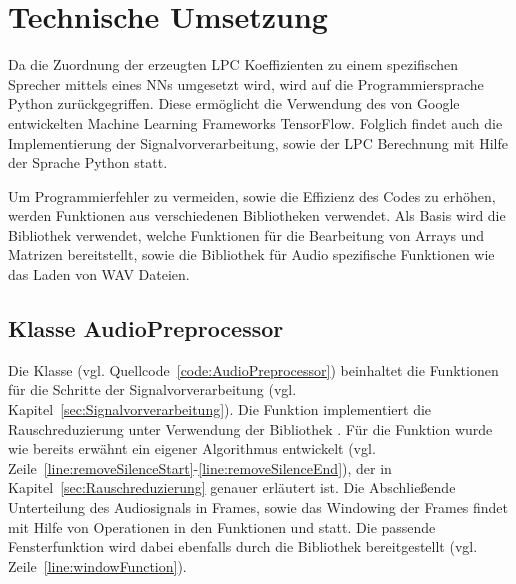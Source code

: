 \section{Technische Umsetzung}\label{sec:TechnischeUmsetzung}
Da die Zuordnung der erzeugten \ac{LPC} Koeffizienten zu einem spezifischen Sprecher mittels eines \acp{NN} umgesetzt wird, wird auf die Programmiersprache Python zurückgegriffen.
Diese ermöglicht die Verwendung des von Google entwickelten Machine Learning Frameworks TensorFlow.
Folglich findet auch die Implementierung der Signalvorverarbeitung, sowie der \ac{LPC} Berechnung mit Hilfe der Sprache Python statt.

Um Programmierfehler zu vermeiden, sowie die Effizienz des Codes zu erhöhen, werden Funktionen aus verschiedenen Bibliotheken verwendet.
Als Basis wird die Bibliothek  verwendet, welche Funktionen für die Bearbeitung von Arrays und Matrizen bereitstellt, sowie die Bibliothek  für Audio spezifische Funktionen wie das Laden von WAV Dateien.

\subsection{Klasse AudioPreprocessor}
Die Klasse  (vgl. Quellcode~\ref{code:AudioPreprocessor}) beinhaltet die Funktionen für die Schritte der Signalvorverarbeitung (vgl. Kapitel~\ref{sec:Signalvorverarbeitung}).
Die Funktion  implementiert die Rauschreduzierung unter Verwendung der Bibliothek .
Für die Funktion  wurde wie bereits erwähnt ein eigener Algorithmus entwickelt (vgl. Zeile~\ref{line:removeSilenceStart}-\ref{line:removeSilenceEnd}), der in Kapitel~\ref{sec:Rauschreduzierung} genauer erläutert ist.
Die Abschließende Unterteilung des Audiosignals in Frames, sowie das Windowing der Frames findet mit Hilfe von  Operationen in den Funktionen  und  statt.
Die passende Fensterfunktion wird dabei ebenfalls durch die   Bibliothek bereitgestellt (vgl. Zeile~\ref{line:windowFunction}).

